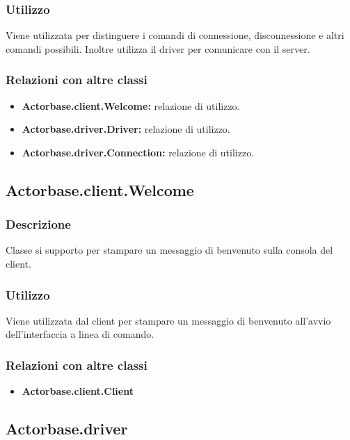 \documentclass[a4paper]{article}
\begin{document}
			\subsubsection{Utilizzo}
				Viene utilizzata per distinguere i comandi di connessione, disconnessione e altri comandi possibili. Inoltre utilizza il driver per comunicare 
				con il server.
				
			\subsubsection{Relazioni con altre classi}
				\begin{itemize}
					\item \textbf{Actorbase.client.Welcome:} relazione di utilizzo.
					\item \textbf{Actorbase.driver.Driver:} relazione di utilizzo.
					\item \textbf{Actorbase.driver.Connection:} relazione di utilizzo.
				\end{itemize}
		
		\subsection{Actorbase.client.Welcome}
			\subsubsection{Descrizione}
				Classe si supporto per stampare un messaggio di benvenuto sulla consola del client.
				
			\subsubsection{Utilizzo}
				Viene utilizzata dal client per stampare un messaggio di benvenuto all'avvio dell'interfaccia a linea di comando.
				
			\subsubsection{Relazioni con altre classi}
				\begin{itemize}
					\item \textbf{Actorbase.client.Client}
				\end{itemize}
				
		\subsection{Actorbase.driver}
		
\end{document}
